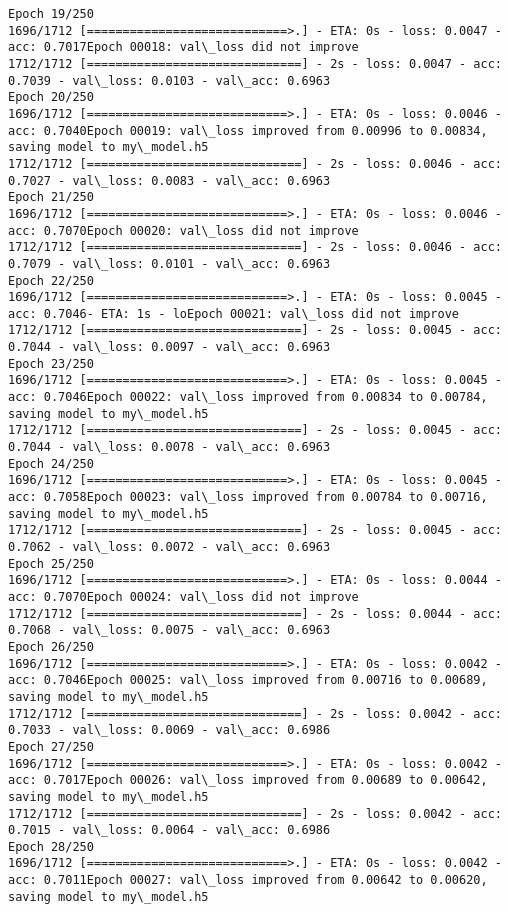 \documentclass[11pt]{article}
\begin{document}
\begin{Verbatim}[commandchars=\\\{\}]
Epoch 19/250
1696/1712 [============================>.] - ETA: 0s - loss: 0.0047 - acc: 0.7017Epoch 00018: val\_loss did not improve
1712/1712 [==============================] - 2s - loss: 0.0047 - acc: 0.7039 - val\_loss: 0.0103 - val\_acc: 0.6963
Epoch 20/250
1696/1712 [============================>.] - ETA: 0s - loss: 0.0046 - acc: 0.7040Epoch 00019: val\_loss improved from 0.00996 to 0.00834, saving model to my\_model.h5
1712/1712 [==============================] - 2s - loss: 0.0046 - acc: 0.7027 - val\_loss: 0.0083 - val\_acc: 0.6963
Epoch 21/250
1696/1712 [============================>.] - ETA: 0s - loss: 0.0046 - acc: 0.7070Epoch 00020: val\_loss did not improve
1712/1712 [==============================] - 2s - loss: 0.0046 - acc: 0.7079 - val\_loss: 0.0101 - val\_acc: 0.6963
Epoch 22/250
1696/1712 [============================>.] - ETA: 0s - loss: 0.0045 - acc: 0.7046- ETA: 1s - loEpoch 00021: val\_loss did not improve
1712/1712 [==============================] - 2s - loss: 0.0045 - acc: 0.7044 - val\_loss: 0.0097 - val\_acc: 0.6963
Epoch 23/250
1696/1712 [============================>.] - ETA: 0s - loss: 0.0045 - acc: 0.7046Epoch 00022: val\_loss improved from 0.00834 to 0.00784, saving model to my\_model.h5
1712/1712 [==============================] - 2s - loss: 0.0045 - acc: 0.7044 - val\_loss: 0.0078 - val\_acc: 0.6963
Epoch 24/250
1696/1712 [============================>.] - ETA: 0s - loss: 0.0045 - acc: 0.7058Epoch 00023: val\_loss improved from 0.00784 to 0.00716, saving model to my\_model.h5
1712/1712 [==============================] - 2s - loss: 0.0045 - acc: 0.7062 - val\_loss: 0.0072 - val\_acc: 0.6963
Epoch 25/250
1696/1712 [============================>.] - ETA: 0s - loss: 0.0044 - acc: 0.7070Epoch 00024: val\_loss did not improve
1712/1712 [==============================] - 2s - loss: 0.0044 - acc: 0.7068 - val\_loss: 0.0075 - val\_acc: 0.6963
Epoch 26/250
1696/1712 [============================>.] - ETA: 0s - loss: 0.0042 - acc: 0.7046Epoch 00025: val\_loss improved from 0.00716 to 0.00689, saving model to my\_model.h5
1712/1712 [==============================] - 2s - loss: 0.0042 - acc: 0.7033 - val\_loss: 0.0069 - val\_acc: 0.6986
Epoch 27/250
1696/1712 [============================>.] - ETA: 0s - loss: 0.0042 - acc: 0.7017Epoch 00026: val\_loss improved from 0.00689 to 0.00642, saving model to my\_model.h5
1712/1712 [==============================] - 2s - loss: 0.0042 - acc: 0.7015 - val\_loss: 0.0064 - val\_acc: 0.6986
Epoch 28/250
1696/1712 [============================>.] - ETA: 0s - loss: 0.0042 - acc: 0.7011Epoch 00027: val\_loss improved from 0.00642 to 0.00620, saving model to my\_model.h5

\end{Verbatim}
\end{document}
